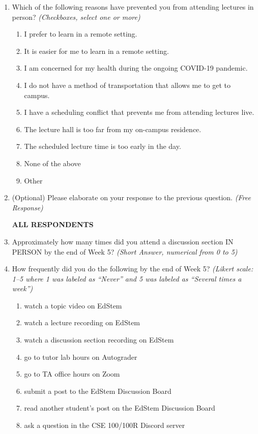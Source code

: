 \begin{enumerate}
    \item Which of the following reasons have prevented you from attending lectures in person? \textit{(Checkboxes, select one or more)}
    \begin{enumerate}
        \item I prefer to learn in a remote setting.
        \item It is easier for me to learn in a remote setting.
        \item I am concerned for my health during the ongoing COVID-19 pandemic.
        \item I do not have a method of transportation that allows me to get to campus.
        \item I have a scheduling conflict that prevents me from attending lectures live.
        \item The lecture hall is too far from my on-campus residence.
        \item The scheduled lecture time is too early in the day.
        \item None of the above
        \item Other
    \end{enumerate}

    \item (Optional) Please elaborate on your response to the previous question. \textit{(Free Response)}

\noindent \textbf{ALL RESPONDENTS}

    \item Approximately how many times did you attend a discussion section IN PERSON by the end of Week 5? \textit{(Short Answer, numerical from 0 to 5)}

    \item How frequently did you do the following by the end of Week 5? \textit{(Likert scale: 1–5 where 1 was labeled as ``Never'' and 5 was labeled as ``Several times a week'')}
    \begin{enumerate}
        \item watch a topic video on EdStem
        \item watch a lecture recording on EdStem
        \item watch a discussion section recording on EdStem
        \item go to tutor lab hours on Autograder
        \item go to TA office hours on Zoom
        \item submit a post to the EdStem Discussion Board
        \item read another student's post on the EdStem Discussion Board
        \item ask a question in the CSE 100/100R Discord server
    \end{enumerate}


\end{enumerate}
